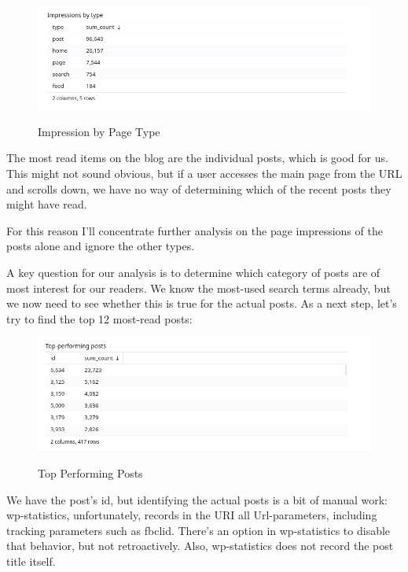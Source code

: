 \begin{figure}[H]
\centering
\caption {Impression by Page Type}
\includegraphics[width=\linewidth]{images/figure11.png}
\label{fig:impressionType}
\end{figure}

The most read items on the blog are the individual posts, which is good for us. This might not sound obvious, but if a user accesses the main page from the URL and scrolls down, we have no way of determining which of the recent posts they might have read.

For this reason I'll concentrate further analysis on the page impressions of the posts alone and ignore the other types.

A key question for our analysis is to determine which category of posts are of most interest for our readers. We know the most-used search terms already, but we now need to see whether this is true for the actual posts. As a next step, let's try to find the top 12 most-read posts:

\begin{figure}[H]
\centering
\caption {Top Performing Posts}
\includegraphics[width=\linewidth]{images/figure12.png}
\label{fig:topPerforming}
\end{figure}

We have the post's id, but identifying the actual posts is a bit of manual work: wp-statistics, unfortunately, records in the URI all Url-parameters, including tracking parameters such as fbclid. There's an option in wp-statistics to disable that behavior, but not retroactively. Also, wp-statistics does not record the post title itself. 

